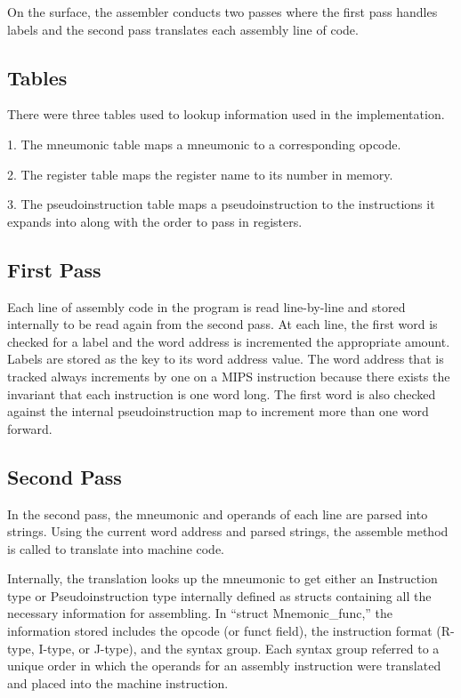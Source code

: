 \documentclass[titlepage]{article}
\begin{document}
On the surface, the assembler conducts two passes where the first pass handles 
labels and the second pass translates each assembly line of code. 

\subsection*{Tables}
There were three tables used to lookup information used in the implementation.

1. The mneumonic table maps a mneumonic to a corresponding opcode.

2. The register table maps the register name to its number in memory.

3. The pseudoinstruction table maps a pseudoinstruction to the instructions
it expands into along with the order to pass in registers.

\subsection*{First Pass}
Each line of assembly code in the program is read line-by-line and stored 
internally to be read again from the second pass. At each line, the first word 
is checked for a label and the word address is incremented the appropriate 
amount. Labels are stored as the key to its word address value. The word address
that is tracked always increments by one on a MIPS instruction because there 
exists the invariant that each instruction is one word long. The first word is
also checked against the internal pseudoinstruction map to increment more than 
one word forward.

\subsection*{Second Pass}
In the second pass, the mneumonic and operands of each line are parsed into 
strings. Using the current word address and parsed strings, the assemble method 
is called to translate into machine code. 

Internally, the translation looks up the mneumonic to get either an Instruction
type or Pseudoinstruction type internally defined as structs containing all the
necessary information for assembling. In ``struct Mnemonic\_func,'' the 
information stored includes the opcode (or funct field), the instruction format 
(R-type, I-type, or J-type), and the syntax group. Each syntax group referred to
a unique order in which the operands for an assembly instruction were translated
and placed into the machine instruction. 
\end{document}
